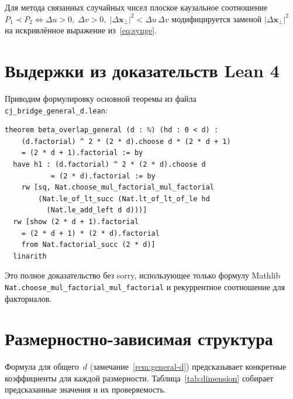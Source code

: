 \documentclass[12pt,a4paper]{article}
\theoremstyle{plain}
\theoremstyle{definition}
\theoremstyle{remark}
\begin{document}
Для метода связанных случайных чисел плоское каузальное
соотношение
$P_1 \prec P_2 \Leftrightarrow \Delta u > 0,\; \Delta v > 0,\;
|\Delta\mathbf{x}_\perp|^2 < \Delta u\,\Delta v$ модифицируется
заменой $|\Delta\mathbf{x}_\perp|^2$ на искривлённое
выражение из~\eqref{eq:synge}.

\section{Выдержки из доказательств Lean 4}
\label{app:lean}

Приводим формулировку основной теоремы из файла
\texttt{cj\_bridge\_general\_d.lean}:

\begin{verbatim}
theorem beta_overlap_general (d : ℕ) (hd : 0 < d) :
    (d.factorial) ^ 2 * (2 * d).choose d * (2 * d + 1)
    = (2 * d + 1).factorial := by
  have h1 : (d.factorial) ^ 2 * (2 * d).choose d
           = (2 * d).factorial := by
    rw [sq, Nat.choose_mul_factorial_mul_factorial
        (Nat.le_of_lt_succ (Nat.lt_of_lt_of_le hd
          (Nat.le_add_left d d)))]
  rw [show (2 * d + 1).factorial
    = (2 * d + 1) * (2 * d).factorial
    from Nat.factorial_succ (2 * d)]
  linarith
\end{verbatim}

\noindent
Это полное доказательство без sorry, использующее только
формулу Mathlib
\texttt{Nat.choose\_mul\_factorial\_mul\_factorial} и
рекуррентное соотношение для факториалов.

\section{Размерностно-зависимая структура}
\label{app:dimension}

Формула для общего~$d$ (замечание~\ref{rem:general-d})
предсказывает конкретные коэффициенты для каждой размерности.
Таблица~\ref{tab:dimension} собирает предсказанные значения
и их проверяемость.
\end{document}
